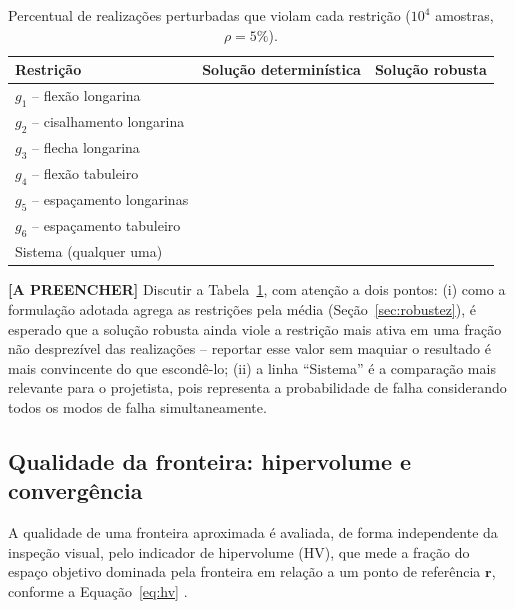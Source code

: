 \begin{table}[!ht]
\caption{Percentual de realizações perturbadas que violam cada restrição ($10^4$ amostras, $\rho = 5\%$).\label{tab:validacao_mc}}
\begin{threeparttable}
\begin{tabular*}{\columnwidth}{@{\extracolsep\fill}lcc@{\extracolsep\fill}}
\toprule
Restrição & Solução determinística & Solução robusta \\
\midrule
$g_1$ -- flexão longarina & \tofill{--\%} & \tofill{--\%} \\
$g_2$ -- cisalhamento longarina & \tofill{--\%} & \tofill{--\%} \\
$g_3$ -- flecha longarina & \tofill{--\%} & \tofill{--\%} \\
$g_4$ -- flexão tabuleiro & \tofill{--\%} & \tofill{--\%} \\
$g_5$ -- espaçamento longarinas & \tofill{--\%} & \tofill{--\%} \\
$g_6$ -- espaçamento tabuleiro & \tofill{--\%} & \tofill{--\%} \\
\midrule
Sistema (qualquer uma) & \tofill{--\%} & \tofill{--\%} \\
\bottomrule
\end{tabular*}
\end{threeparttable}
\end{table}

\begin{fillblock}
\noindent\textbf{[A PREENCHER]} Discutir a Tabela~\ref{tab:validacao_mc}, com atenção a dois pontos: (i) como a formulação adotada agrega as restrições pela média (Seção~\ref{sec:robustez}), é esperado que a solução robusta ainda viole a restrição mais ativa em uma fração não desprezível das realizações -- reportar esse valor sem maquiar o resultado é mais convincente do que escondê-lo; (ii) a linha ``Sistema'' é a comparação mais relevante para o projetista, pois representa a probabilidade de falha considerando todos os modos de falha simultaneamente.
\end{fillblock}

\subsection{Qualidade da fronteira: hipervolume e convergência}\label{sec:hipervolume}

A qualidade de uma fronteira aproximada é avaliada, de forma independente da inspeção visual, pelo indicador de hipervolume (HV), que mede a fração do espaço objetivo dominada pela fronteira em relação a um ponto de referência $\mathbf{r}$, conforme a Equação~\eqref{eq:hv} \parencite{blank2020}.


